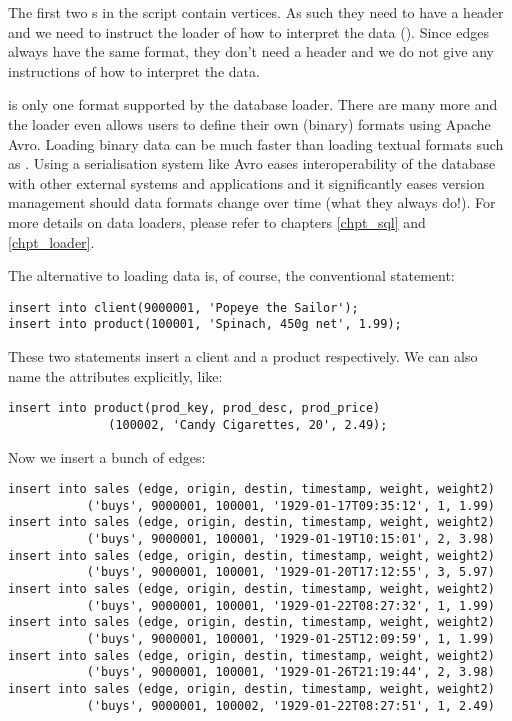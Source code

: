 The first two s in the script contain vertices.
As such they need to have a header and we need to instruct
the loader of how to interpret the data ().
Since edges always have the same format, they don't need a header
and we do not give any instructions of how to interpret the data.

 is only one format supported by the database loader.
There are many more and the loader even allows users to define
their own (binary) formats using Apache Avro. Loading binary data 
can be much faster than loading textual formats such as .
Using a serialisation system like Avro eases
interoperability of the database with other
external systems and applications and it
significantly eases version management should data formats
change over time (what they always do!). 
For more details on data loaders, please refer to chapters
\ref{chpt_sql} and \ref{chpt_loader}.

The alternative to loading data is, of course, the conventional
 statement:

\begin{sqlcode}
\begin{lstlisting}
insert into client(9000001, 'Popeye the Sailor');
insert into product(100001, 'Spinach, 450g net', 1.99);
\end{lstlisting}
\end{sqlcode}

These two statements insert a client and a product respectively.
We can also name the attributes explicitly, like:

\begin{sqlcode}
\begin{lstlisting}
insert into product(prod_key, prod_desc, prod_price)
              (100002, 'Candy Cigarettes, 20', 2.49);
\end{lstlisting}
\end{sqlcode}

Now we insert a bunch of edges:

\begin{sqlcode}
\begin{lstlisting}
insert into sales (edge, origin, destin, timestamp, weight, weight2)
           ('buys', 9000001, 100001, '1929-01-17T09:35:12', 1, 1.99)
insert into sales (edge, origin, destin, timestamp, weight, weight2)
           ('buys', 9000001, 100001, '1929-01-19T10:15:01', 2, 3.98)
insert into sales (edge, origin, destin, timestamp, weight, weight2)
           ('buys', 9000001, 100001, '1929-01-20T17:12:55', 3, 5.97)
insert into sales (edge, origin, destin, timestamp, weight, weight2)
           ('buys', 9000001, 100001, '1929-01-22T08:27:32', 1, 1.99)
insert into sales (edge, origin, destin, timestamp, weight, weight2)
           ('buys', 9000001, 100001, '1929-01-25T12:09:59', 1, 1.99)
insert into sales (edge, origin, destin, timestamp, weight, weight2)
           ('buys', 9000001, 100001, '1929-01-26T21:19:44', 2, 3.98)
insert into sales (edge, origin, destin, timestamp, weight, weight2)
           ('buys', 9000001, 100002, '1929-01-22T08:27:51', 1, 2.49)
\end{lstlisting}
\end{sqlcode}

